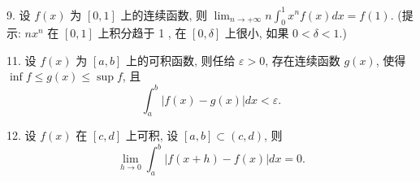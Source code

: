 9. 设 $f(x)$ 为 $[0,1]$ 上的连续函数, 则 $\lim_{n\rightarrow+\infty}n\int_{0}^{1}x^{n}f(x)dx=f(1)$.
(提示: $nx^{n}$ 在 $[0,1]$ 上积分趋于 1 , 在 $[0,\delta]$ 上很小, 如果 $0<\delta<1$.)

11. 设 $f(x)$ 为 $[a,b]$ 上的可积函数, 则任给 $\varepsilon>0$, 存在连续函数 $g(x)$,
使得 $\inf f\leqslant g(x)\leqslant\sup f$, 且 
\[
\int_{a}^{b}|f(x)-g(x)|dx<\varepsilon.
\]

12. 设 $f(x)$ 在 $[c,d]$ 上可积, 设 $[a,b]\subset(c,d)$, 则 
\[
\lim_{h\rightarrow0}\int_{a}^{b}|f(x+h)-f(x)|dx=0.
\]

